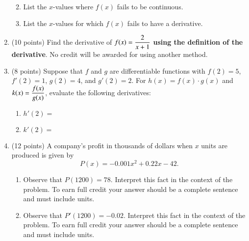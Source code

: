 \documentclass[12pt]{article}
\begin{document}
\begin{enumerate}
\begin{enumerate}
\begin{multicols}{2}
\vspace{\mysep}
\end{multicols}
\vspace{1cm}
\item List the $x$-values where $f(x)$ fails to be continuous.\\
\vfill
\item List the $x$-values for which $f(x)$ fails to have a derivative.\\\vfill
\vspace{\mysep}
\end{enumerate}
\newpage
\item (10 points) Find the derivative of $f(x)=\large{\displaystyle{\frac{2}{x+1}}}$ \textbf{using the definition of the derivative}. No credit will be awarded for using another method.
\newpage
\item (8 points) Suppose that $f$ and $g$ are differentiable functions with $f(2)=5$, $f'(2)=1$, $g(2)=4$, and $g'(2)=2$. For $h(x)=f(x)\cdot g(x)$ and $k(x)=\large{\displaystyle{\frac{f(x)}{g(x)}}}$, evaluate the following derivatives:\\ 

	\begin{enumerate}

	\item $h'(2)=$\\ \vfill

	\item $k'(2)=$\\ \vfill 

	\end{enumerate}

\item (12 points) A company's profit in thousands of dollars when $x$ units are produced is given by $$P(x)=-0.001x^2+0.22x-42.$$

	\begin{enumerate}

	\item Observe that $P(1200) = 78$. Interpret this fact in the context of the problem. To earn full credit your answer should be a complete sentence and must include units.

	\vspace{1in}

	\item Observe that $P'(1200) = -0.02$. Interpret this fact in the context of the problem. To earn full credit your answer should be a complete sentence and must include units.


\end{enumerate}
\end{enumerate}
\end{document}

